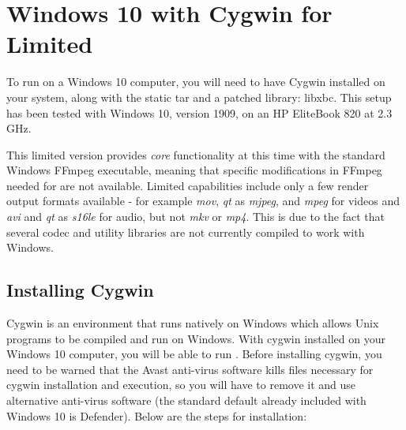 \section{Windows 10 with Cygwin for \CGG{} Limited}%
\label{sec:ms_windows10}

To run \CGG{} on a Windows 10 computer, you will need to have Cygwin installed on your system, 
along with the  \CGG{} static tar and a patched library: libxbc.  This setup has been tested 
with Windows 10, version 1909, on an HP EliteBook 820 at 2.3 GHz.

This limited version provides \textit{core} functionality at this time with the standard Windows FFmpeg
executable, meaning that specific modifications in FFmpeg needed for \CGG{} are not available. 
Limited capabilities include only a few render output formats available - for example \textit{mov}, \textit{qt} 
as \textit{mjpeg}, and \textit{mpeg} for videos and \textit{avi} and \textit{qt} as \textit{s16le} 
for audio, but not \textit{mkv} or \textit{mp4}.  
This is due to the fact that several codec and utility libraries are not currently compiled to 
work with Windows.

\subsection*{Installing Cygwin}
\label{sec:installing_cygwin}

Cygwin is an environment that runs natively on Windows which allows Unix programs to be compiled 
and run on Windows.  With cygwin installed on your Windows 10 computer, you will be able to run 
\CGG{}.  Before installing cygwin, you need to be warned that the Avast anti-virus software 
kills files necessary for cygwin installation and execution, so you will have to remove it and 
use alternative anti-virus software (the standard default already included with Windows 10 
is Defender). Below are the steps for installation:

